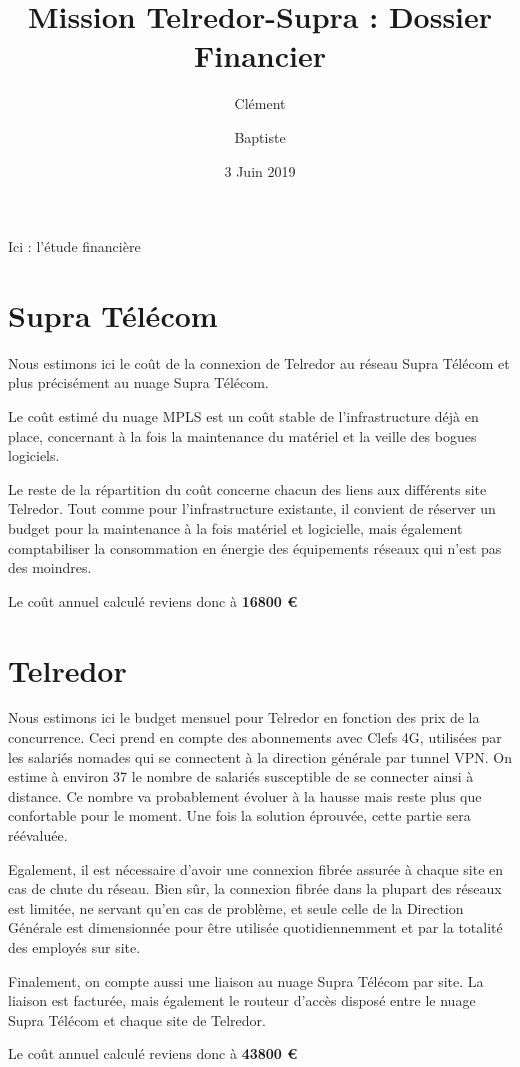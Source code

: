 \documentclass{article}
\title{Mission Telredor-Supra : Dossier Financier}
\date{3 Juin 2019}
\author{Clément \bsc{Boutin} \and Baptiste \bsc{Saclier}}
\newcommand{\tlr}{Telredor\xspace}
\newcommand{\spr}{Supra Télécom\xspace}
\begin{document}
\begin{center}
Ici : l'étude financière
	\section{\spr}

	Nous estimons ici le coût de la connexion de \tlr au réseau \spr et plus précisément au nuage \spr .

	Le coût estimé du nuage MPLS est un coût stable de l'infrastructure déjà en place, concernant à la fois la maintenance du matériel et la veille des bogues logiciels.

	Le reste de la répartition du coût concerne chacun des liens aux différents site \tlr .
	Tout comme pour l'infrastructure existante, il convient de réserver un budget pour la maintenance à la fois matériel et logicielle, mais également comptabiliser la consommation en énergie des équipements réseaux qui n'est pas des moindres.

	Le coût annuel calculé reviens donc à \textbf{16800 \euro}

	

	\section{\tlr}

	Nous estimons ici le budget mensuel pour Telredor en fonction des prix de la concurrence.
	Ceci prend en compte des abonnements avec Clefs 4G, utilisées par les salariés nomades qui se connectent à la direction générale par tunnel VPN.
	On estime à environ 37 le nombre de salariés susceptible de se connecter ainsi à distance.
	Ce nombre va probablement évoluer à la hausse mais reste plus que confortable pour le moment.
	Une fois la solution éprouvée, cette partie sera réévaluée.
	
	Egalement, il est nécessaire d'avoir une connexion fibrée assurée à chaque site en cas de chute du réseau.
	Bien sûr, la connexion fibrée dans la plupart des réseaux est limitée, ne servant qu'en cas de problème, et seule celle de la Direction Générale est dimensionnée pour être utilisée quotidiennemment et par la totalité des employés sur site.

	Finalement, on compte aussi une liaison au nuage \spr par site. La liaison est facturée, mais également le routeur d'accès disposé entre le nuage \spr et chaque site de \tlr .
	

	Le coût annuel calculé reviens donc à \textbf{43800 \euro}

\end{center}
\end{document}
